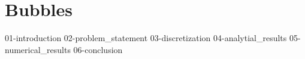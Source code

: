 \chapter{Bubbles}

{01-introduction}
{02-problem_statement}
{03-discretization}
{04-analytial_results}
{05-numerical_results}
{06-conclusion}
